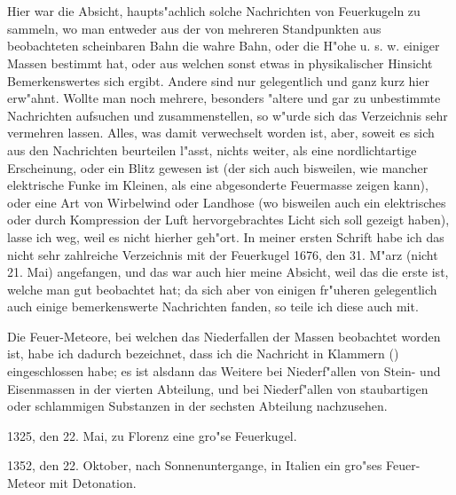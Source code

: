 \documentclass[a4paper, 11pt, oneside, polutonikogreek, german]{article}
\begin{document}
\section{}
\paragraph{}
Hier war die Absicht, haupts"achlich solche Nachrichten von Feuerkugeln zu sammeln, wo man entweder aus der von mehreren Standpunkten aus beobachteten scheinbaren Bahn die wahre Bahn, oder die H"ohe u. s. w. einiger Massen bestimmt hat, oder aus welchen sonst etwas in physikalischer Hinsicht Bemerkenswertes sich ergibt. Andere sind nur gelegentlich und ganz kurz hier erw"ahnt. Wollte man noch mehrere, besonders "altere und gar zu unbestimmte Nachrichten aufsuchen und zusammenstellen, so w"urde sich das Verzeichnis sehr vermehren lassen. Alles, was damit verwechselt worden ist, aber, soweit es sich aus den Nachrichten beurteilen l"asst, nichts weiter, als eine nordlichtartige Erscheinung, oder ein Blitz gewesen ist (der sich auch bisweilen, wie mancher elektrische Funke im Kleinen, als eine abgesonderte Feuermasse zeigen kann), oder eine Art von Wirbelwind oder Landhose (wo bisweilen auch ein elektrisches oder durch Kompression der Luft hervorgebrachtes Licht sich soll gezeigt haben), lasse ich weg, weil es nicht hierher geh"ort. In meiner ersten Schrift habe ich das nicht sehr zahlreiche Verzeichnis mit der Feuerkugel 1676, den 31. M"arz (nicht 21. Mai) angefangen, und das war auch hier meine Absicht, weil das die erste ist, welche man gut beobachtet hat; da sich aber von einigen fr"uheren gelegentlich auch einige bemerkenswerte Nachrichten fanden, so teile ich diese auch mit.

Die Feuer-Meteore, bei welchen das Niederfallen der Massen beobachtet worden ist, habe ich dadurch bezeichnet, dass ich die Nachricht in Klammern () eingeschlossen habe; es ist alsdann das Weitere bei Niederf"allen von Stein- und Eisenmassen in der vierten Abteilung, und bei Niederf"allen von staubartigen oder schlammigen Substanzen in der sechsten Abteilung nachzusehen.
\vspace{1ex}

1325, den 22. Mai, zu Florenz eine gro"se Feuerkugel.

1352, den 22. Oktober, nach Sonnenuntergange, in Italien ein gro"ses Feuer-Meteor mit Detonation.
\end{document}

